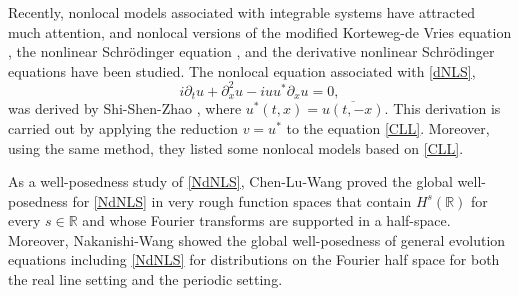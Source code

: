\documentclass[%
11pt,  reqno]{amsart}
\newcommand{\R}{\mathbb{R}}
\newcommand{\cj}{\overline}
\newcommand{\dx}{\partial_x}
\newcommand{\dt}{\partial_t}
\numberwithin{equation}{section}
\numberwithin{theorem}{section}
\begin{document}
Recently, nonlocal models associated with integrable systems have attracted much attention, 
and nonlocal versions of the modified Korteweg-de Vries equation \cite{AbMu17}, 
the nonlinear Schr\"odinger equation \cite{AbMu13}, and 
the derivative nonlinear Schr\"odinger equations \cite{AbMu17} have been studied.
The nonlocal equation associated with \eqref{dNLS},
\begin{equation}
i \dt u + \dx^2 u - i u u^\ast \dx u = 0,
\label{NdNLS}
\end{equation} 
was derived by Shi-Shen-Zhao \cite{SSZ19}, where $u^\ast(t,x) = \cj {u (t,-x)}$. 
This derivation is carried out by applying the reduction $v = u^\ast$ to the equation \eqref{CLL}.
Moreover, using the same method, 
they listed some nonlocal models based on \eqref{CLL}.

As a well-posedness study of \eqref{NdNLS},
Chen-Lu-Wang \cite{CLW23} proved the global well-posedness for \eqref{NdNLS} 
in very rough function spaces that contain $H^s(\R)$ for every $s \in \R$ and whose Fourier transforms are supported in a half-space.
Moreover, Nakanishi-Wang \cite{NaWa25} showed the global well-posedness of general evolution equations including \eqref{NdNLS} for distributions on the Fourier half space
for both the real line setting and the periodic setting.
\end{document}
